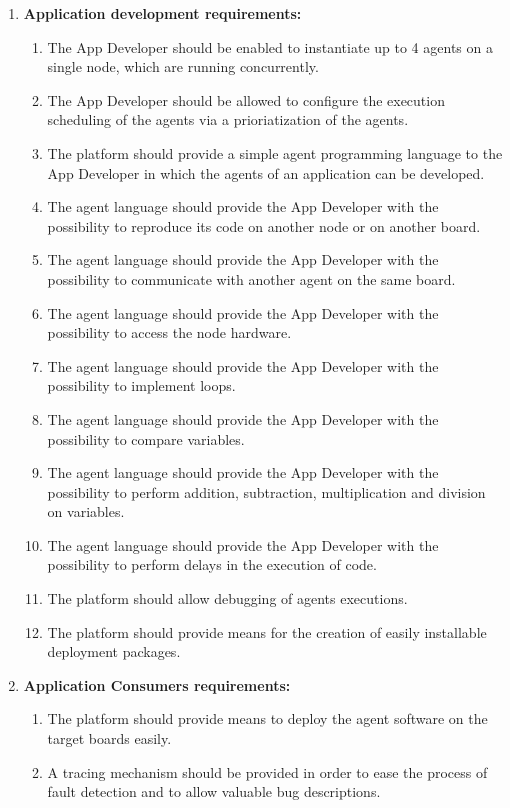 \documentclass{scrreprt}
\begin{document}
\begin{enumerate}
\item	\textbf{Application development requirements:}
\begin{enumerate}
\item The App Developer should be enabled to instantiate up to 4 agents on a single node, which are running concurrently.
\item The App Developer should be allowed to configure the execution scheduling of the agents via a prioriatization of the agents.
\item The platform should provide a simple agent programming language to the App Developer in which the agents of an application can be developed.
\item The agent language should provide the App Developer with the possibility to reproduce its code on another node or on another board.
\item The agent language should provide the App Developer with the possibility to communicate with another agent on the same board.
\item The agent language should provide the App Developer with the possibility to access the node hardware.
\item The agent language should provide the App Developer with the possibility to implement loops. 
\item The agent language should provide the App Developer with the possibility to compare variables.
\item The agent language should provide the App Developer with the possibility to perform addition, subtraction, multiplication and division on variables.
\item The agent language should provide the App Developer with the possibility to perform delays in the execution of code.
\item The platform should allow debugging of agents executions.
\item The platform should provide means for the creation of easily installable deployment packages.
\end{enumerate}


\item\textbf{Application Consumers requirements:}
\begin{enumerate}
\item The platform should provide means to deploy the agent software on the target boards easily.
\item A tracing mechanism should be provided in order to ease the process of fault detection and to allow valuable bug descriptions.
\end{enumerate}


\end{enumerate}
\end{document}
